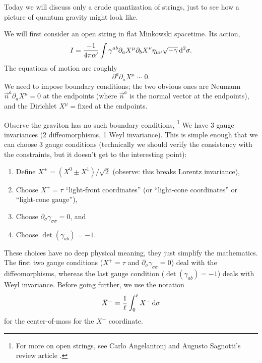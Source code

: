 \lecture

Today we will discuss only a crude quantization of strings, just to see
how a picture of quantum gravity might look like.

We will first consider an open string in flat Minkowski spacetime. Its
action,
\begin{equation}
I=\frac{-1}{4\pi\alpha'}\int\gamma^{ab}\partial_{a}X^{\mu}\partial_{b}X^{\nu}\eta_{\mu\nu}\sqrt{-\gamma}\,\mathrm{d}^{2}\sigma.
\end{equation}
The equations of motion are roughly
\begin{equation}
\partial^{a}\partial_{a}X^{\mu}\sim0.
\end{equation}
We need to impose boundary conditions; the two obvious ones are Neumann
$\vec{n}^{a}\partial_{a}X^{\mu}=0$ at the endpoints (where $\vec{n}^{a}$
is the normal vector at the endpoints), and the Dirichlet
$X^{\mu}=\mbox{fixed}$ at the endpoints.

Observe the graviton has no such boundary conditions, \footnote{For more
on open strings, see Carlo Angelantonj and Augusto Sagnotti's review article .}
We have 3 gauge invariances (2 diffeomorphisms, 1 Weyl invariance). This
is simple enough that we can choose 3 gauge conditions (technically we
should verify the consistency with the constraints, but it doesn't get
to the interesting point):
\begin{enumerate}[start=0]
\item Define $X^{\pm} = (X^{0}\pm X^{1})/\sqrt{2}$ (observe: this breaks
  Lorentz invariance),
\item Choose $X^{+}=\tau$ ``light-front coordinates'' (or ``light-cone coordinates'' or ``light-cone gauge''),
\item Choose $\partial_{\sigma}\gamma_{\sigma\sigma}=0$, and
\item Choose $\det(\gamma_{ab})=-1$.
\end{enumerate}
These choices have no deep physical meaning, they just simplify the
mathematics. The first two gauge conditions ($X^{+}=\tau$ and
$\partial_{\sigma}\gamma_{\sigma\sigma}=0$) deal with the
diffeomorphisms, whereas the last gauge condition
($\det(\gamma_{ab})=-1$) deals with Weyl invariance.
Before going further, we use the notation
\begin{equation}
\bar{X}^{-} = \frac{1}{\ell}\int^{\ell}_{0}X^{-}\,\mathrm{d}\sigma
\end{equation}
for the center-of-mass for the $X^{-}$ coordinate.

